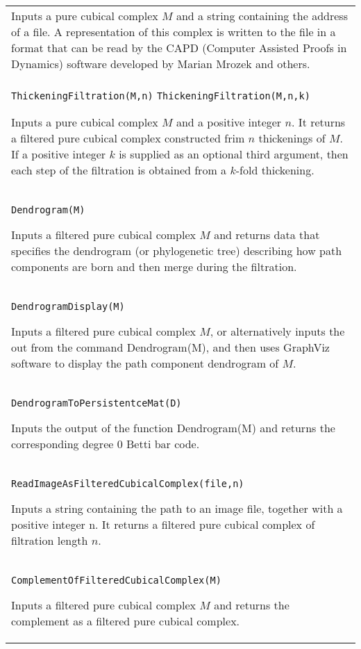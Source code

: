 \documentclass[a4paper,11pt]{report}
\begin{document}
{\begin{center}
\begin{tabular}{|l|}
 Inputs a pure cubical complex $M$ and a string containing the address of a file. A representation of this
complex is written to the file in a format that can be read by the CAPD
(Computer Assisted Proofs in Dynamics) software developed by Marian Mrozek and
others. \\
 \index{ThickeningFiltration} \texttt{ThickeningFiltration(M,n)} \texttt{ThickeningFiltration(M,n,k)} 

 Inputs a pure cubical complex $M$ and a positive integer $n$. It returns a filtered pure cubical complex constructed frim $n$ thickenings of $M$. If a positive integer $k$ is supplied as an optional third argument, then each step of the filtration is
obtained from a $k$-fold thickening. \\
 \index{Dendrogram} \texttt{Dendrogram(M)} 

 Inputs a filtered pure cubical complex $M$ and returns data that specifies the dendrogram (or phylogenetic tree)
describing how path components are born and then merge during the filtration. \\
 \index{DendrogramDisplay} \texttt{DendrogramDisplay(M)} 

 Inputs a filtered pure cubical complex $M$, or alternatively inputs the out from the command Dendrogram(M), and then
uses GraphViz software to display the path component dendrogram of $M$. \\
 \index{DendrogramToPersistenceMat} \texttt{DendrogramToPersistentceMat(D)} 

 Inputs the output of the function Dendrogram(M) and returns the corresponding
degree 0 Betti bar code. \\
 \index{ReadImageAsFilteredCubicalComplex} \texttt{ReadImageAsFilteredCubicalComplex(file,n)} 

 Inputs a string containing the path to an image file, together with a positive
integer n. It returns a filtered pure cubical complex of filtration length $n$. \\
 \index{ComplementOfFilteredCubicalComplex} \texttt{ComplementOfFilteredCubicalComplex(M)} 

 Inputs a filtered pure cubical complex $M$ and returns the complement as a filtered pure cubical complex. \\
\end{tabular}\\[2mm]
\end{center}

 }

 
\end{document}
